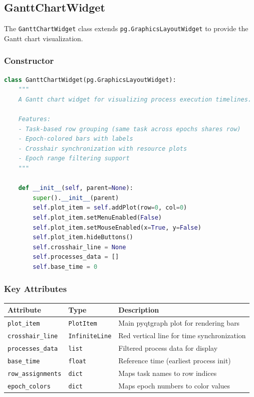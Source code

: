 \documentclass[11pt,a4paper]{article}
\begin{document}
\subsection{GanttChartWidget}

The \texttt{GanttChartWidget} class extends \texttt{pg.GraphicsLayoutWidget} to provide the Gantt chart visualization.

\subsubsection{Constructor}

\begin{lstlisting}[language=Python]
class GanttChartWidget(pg.GraphicsLayoutWidget):
    """
    A Gantt chart widget for visualizing process execution timelines.
    
    Features:
    - Task-based row grouping (same task across epochs shares row)
    - Epoch-colored bars with labels
    - Crosshair synchronization with resource plots
    - Epoch range filtering support
    """
    
    def __init__(self, parent=None):
        super().__init__(parent)
        self.plot_item = self.addPlot(row=0, col=0)
        self.plot_item.setMenuEnabled(False)
        self.plot_item.setMouseEnabled(x=True, y=False)
        self.plot_item.hideButtons()
        self.crosshair_line = None
        self.processes_data = []
        self.base_time = 0
\end{lstlisting}

\subsubsection{Key Attributes}

\begin{table}[h]
\centering
\begin{tabular}{@{}llp{7cm}@{}}
\toprule
\textbf{Attribute} & \textbf{Type} & \textbf{Description} \\
\midrule
\texttt{plot\_item} & \texttt{PlotItem} & Main pyqtgraph plot for rendering bars \\
\texttt{crosshair\_line} & \texttt{InfiniteLine} & Red vertical line for time synchronization \\
\texttt{processes\_data} & \texttt{list} & Filtered process data for display \\
\texttt{base\_time} & \texttt{float} & Reference time (earliest process init) \\
\texttt{row\_assignments} & \texttt{dict} & Maps task names to row indices \\
\texttt{epoch\_colors} & \texttt{dict} & Maps epoch numbers to color values \\
\bottomrule
\end{tabular}
\end{table}
\end{document}
